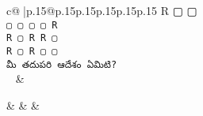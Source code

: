 \documentclass{article}
\begin{document}
{\begin{supertabular}{c@{$\;$}|p{.15\linewidth}@{}p{.15\linewidth}p{.15\linewidth}p{.15\linewidth}p{.15\linewidth}p{.15\linewidth}}
{{{R ▢ ▢\\ \tt ▢ ▢ ▢ ▢ R\\ \tt R ▢ R R ▢\\ \tt R ▢ R ▢ ▢\\ \tt మీ తదుపరి ఆదేశం ఏమిటి?\\ \tt  
	  } 
	   } 
	   } 
	 & \\ 
 

    \theutterance {}  

    &  
	 & & \\ 
 

\end{supertabular}
}
\end{document}
